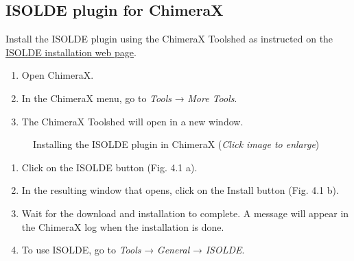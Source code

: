 \documentclass[
  letterpaper,
  DIV=11,
  numbers=noendperiod]{scrreprt}
\providecommand{\tightlist}{%
  \setlength{\itemsep}{0pt}\setlength{\parskip}{0pt}}\usepackage{longtable,booktabs,array}
\begin{document}
\subsection{ISOLDE plugin for
ChimeraX}\label{isolde-plugin-for-chimerax}

Install the ISOLDE plugin using the ChimeraX Toolshed as instructed on
the \href{https://tristanic.github.io/isolde/download/index.html}{ISOLDE
installation web page}.

\begin{enumerate}
\def\labelenumi{\arabic{enumi}.}
\tightlist
\item
  Open ChimeraX.
\item
  In the ChimeraX menu, go to \emph{Tools} → \emph{More Tools}.
\item
  The ChimeraX Toolshed will open in a new window.
\end{enumerate}

\begin{figure}

\begin{minipage}{0.50\linewidth}



\end{minipage}%
%
\begin{minipage}{0.50\linewidth}



\end{minipage}%

\caption{\label{fig-isolde}Installing the ISOLDE plugin in ChimeraX
(\emph{Click image to enlarge})}

\end{figure}%

\begin{enumerate}
\def\labelenumi{\arabic{enumi}.}
\setcounter{enumi}{3}
\tightlist
\item
  Click on the ISOLDE button (Fig. 4.1 a).
\item
  In the resulting window that opens, click on the Install button (Fig.
  4.1 b).
\item
  Wait for the download and installation to complete. A message will
  appear in the ChimeraX log when the installation is done.
\item
  To use ISOLDE, go to \emph{Tools} → \emph{General} → \emph{ISOLDE}.
\end{enumerate}
\end{document}
